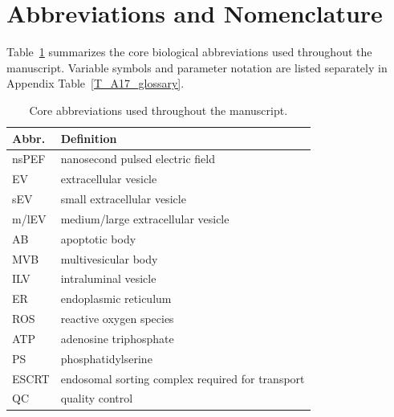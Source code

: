 \documentclass[Afour,sagev,times]{sagej}
\begin{document}

\maketitle

\section*{Abbreviations and Nomenclature}
Table~\ref{T_core_abbreviations} summarizes the core biological abbreviations used throughout the manuscript. Variable symbols and parameter notation are listed separately in Appendix Table~\ref{T_A17_glossary}.

\begin{table}[t]
\footnotesize\sf
\centering
\caption{Core abbreviations used throughout the manuscript.\label{T_core_abbreviations}}
\begin{tabular}{ll}
\toprule
\textbf{Abbr.} & \textbf{Definition} \\
\midrule
nsPEF & nanosecond pulsed electric field \\
EV & extracellular vesicle \\
sEV & small extracellular vesicle \\
m/lEV & medium/large extracellular vesicle \\
AB & apoptotic body \\
MVB & multivesicular body \\
ILV & intraluminal vesicle \\
ER & endoplasmic reticulum \\
ROS & reactive oxygen species \\
ATP & adenosine triphosphate \\
PS & phosphatidylserine \\
ESCRT & endosomal sorting complex required for transport \\
QC & quality control \\
\bottomrule
\end{tabular}
\end{table}
\end{document}
